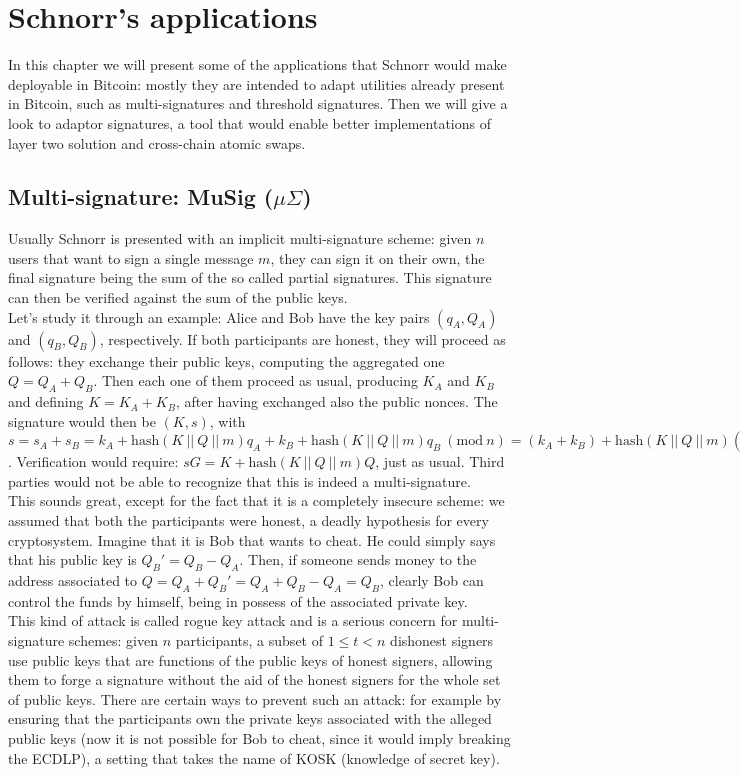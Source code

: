 \chapter{Schnorr's applications}
\label{chpr:application}
In this chapter we will present some of the applications that Schnorr would make deployable in Bitcoin: mostly they are intended to adapt utilities already present in Bitcoin, such as multi-signatures and threshold signatures. Then we will give a look to adaptor signatures, a tool that would enable better implementations of layer two solution and cross-chain atomic swaps.

\bigskip

\section{Multi-signature: MuSig ($\mu \Sigma$)}
\label{musig}
Usually Schnorr is presented with an implicit multi-signature scheme: given $n$ users that want to sign a single message $m$, they can sign it on their own, the final signature being the sum of the so called partial signatures. This signature can then be verified against the sum of the public keys.
\\
Let's study it through an example: Alice and Bob have the key pairs $(q_A, Q_A)$ and $(q_B, Q_B)$, respectively. If both participants are honest, they will proceed as follows: they exchange their public keys, computing the aggregated one $Q = Q_A + Q_B$. Then each one of them proceed as usual, producing $K_A$ and $K_B$ and defining $K = K_A + K_B$, after having exchanged also the public nonces. The signature would then be $(K, s)$, with $s = s_A + s_B = k_A + \text{hash}(K \ || \ Q \ || \ m)q_A + k_B + \text{hash}(K \ || \ Q \ || \ m)q_B \ (\text{mod} \ n)= (k_A + k_B) + \text{hash}(K \ || \ Q \ || \ m)(q_A + q_B) \ (\text{mod} \ n)$. Verification would require: $sG = K + \text{hash}(K \ || \ Q \ || \ m)Q$, just as usual. Third parties would not be able to recognize that this is indeed a multi-signature.
\\
This sounds great, except for the fact that it is a completely insecure scheme: we assumed that both the participants were honest, a deadly hypothesis for every cryptosystem. Imagine that it is Bob that wants to cheat. He could simply says that his public key is $Q_B' = Q_B - Q_A$. Then, if someone sends money to the address associated to $Q = Q_A + Q_B' = Q_A + Q_B - Q_A = Q_B$, clearly Bob can control the funds by himself, being in possess of the associated private key.
\\
This kind of attack is called rogue key attack and is a serious concern for multi-signature schemes: given $n$ participants, a subset of $1 \leq t < n$ dishonest signers use public keys that are functions of the public keys of honest signers, allowing them to forge a signature without the aid of the honest signers for the whole set of public keys. There are certain ways to prevent such an attack: for example by ensuring that the participants own the private keys associated with the alleged public keys (now it is not possible for Bob to cheat, since it would imply breaking the ECDLP), a setting that takes the name of KOSK (knowledge of secret key). 

